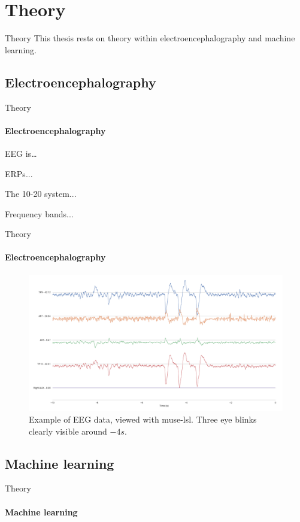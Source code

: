 \documentclass[xcolor={dvipsnames,table},12pt]{beamer}
\newif\ifplacelogo{}  %
\begin{document}
\section{Theory}
\begin{frame}{Theory}
    This thesis rests on theory within electroencephalography and machine learning.
\end{frame}

\subsection{Electroencephalography}
\begin{frame}{Theory}
    \framesubtitle{Electroencephalography}

    EEG is\ldots

    ERPs...

    The 10-20 system...

    Frequency bands...
\end{frame}

\placelogofalse{}
\begin{frame}{Theory}
    \framesubtitle{Electroencephalography}
    \vspace*{-5mm}

    \begin{figure}
        \hspace*{-10mm}
        \includegraphics[width=\paperwidth]{img/muselsl-signal.png}
        \caption{Example of EEG data, viewed with muse-lsl. Three eye blinks clearly visible around $-4s$.}
    \end{figure}
\end{frame}
\placelogotrue{}

\subsection{Machine learning}
\begin{frame}{Theory}
    \framesubtitle{Machine learning}
\end{frame}
\end{document}
